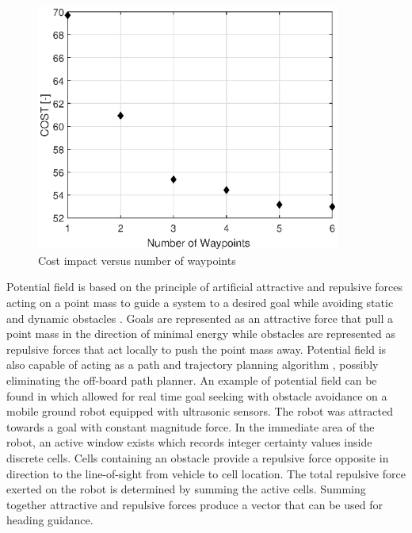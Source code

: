 \documentclass[conf]{new-aiaa}
\begin{document}
\begin{figure}[H]
	\centering
	\includegraphics[width=10cm]{Figures/Waypoints/costVnumWpts}
	\caption{Cost impact versus number of waypoints}
	\label{fig:numWaypoints}
\end{figure}

Potential field is based on the principle of artificial attractive and repulsive forces acting on a point mass to guide a system to a desired goal while avoiding static and dynamic obstacles \cite{khatib_real-time_1986}. Goals are represented as an attractive force that pull a point mass in the direction of minimal energy while obstacles are represented as repulsive forces that act locally to push the point mass away. Potential field is also capable of acting as a path and trajectory planning algorithm \cite{rimon_exact_1992}, possibly eliminating the off-board path planner. An example of potential field can be found in \cite{borenstein_real-time_1990,borenstein_vector_1991,koren_potential_1991} which allowed for real time goal seeking with obstacle avoidance on a mobile ground robot equipped with ultrasonic sensors. The robot was attracted towards a goal with constant magnitude force. In the immediate area of the robot, an active window exists which records integer certainty values inside discrete cells. Cells containing an obstacle provide a repulsive force opposite in direction to the line-of-sight from vehicle to cell location. The total repulsive force exerted on the robot is determined by summing the active cells. Summing together attractive and repulsive forces produce a vector that can be used for heading guidance. \\

%
\end{document}
